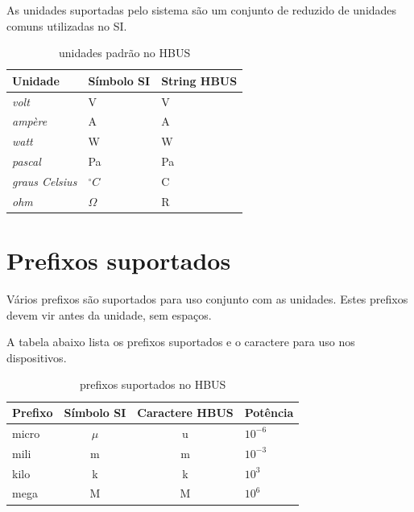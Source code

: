 \documentclass[11pt]{report}
\begin{document}
As unidades suportadas pelo sistema são um conjunto de reduzido de unidades comuns utilizadas no SI.

\begin{table}[H]
\centering
\caption{unidades padrão no HBUS}
\begin{tabular}{l l l}
\hline
Unidade		&	Símbolo SI	&	String HBUS\\
\hline
\textit{volt} & V			&	V\\
\textit{ampère} & A			&   A\\
\textit{watt}   & W			&   W\\
\textit{pascal} & Pa			&   Pa\\
\textit{graus Celsius} & $^{\circ} C$ & C\\
\textit{ohm}		& $\Omega$	&	R\\
\end{tabular}
\end{table}

\section{Prefixos suportados}

Vários prefixos são suportados para uso conjunto com as unidades. Estes prefixos devem vir antes da unidade, sem espaços.

A tabela abaixo lista os prefixos suportados e o caractere para uso nos dispositivos.

\begin{table}[H]
\centering
\caption{prefixos suportados no HBUS}
\begin{tabular}{l c c l}
\hline
Prefixo		&	Símbolo SI	&	Caractere HBUS	&	Potência\\
\hline
micro		&	$\mu$		&	u				&	$10^{-6}$\\
mili			&	m			&	m				&	$10^{-3}$\\
kilo			&	k			&	k				&	$10^3$\\
mega			&	M			&	M				&	$10^6$\\
\hline
\end{tabular}
\end{table}
\end{document}
